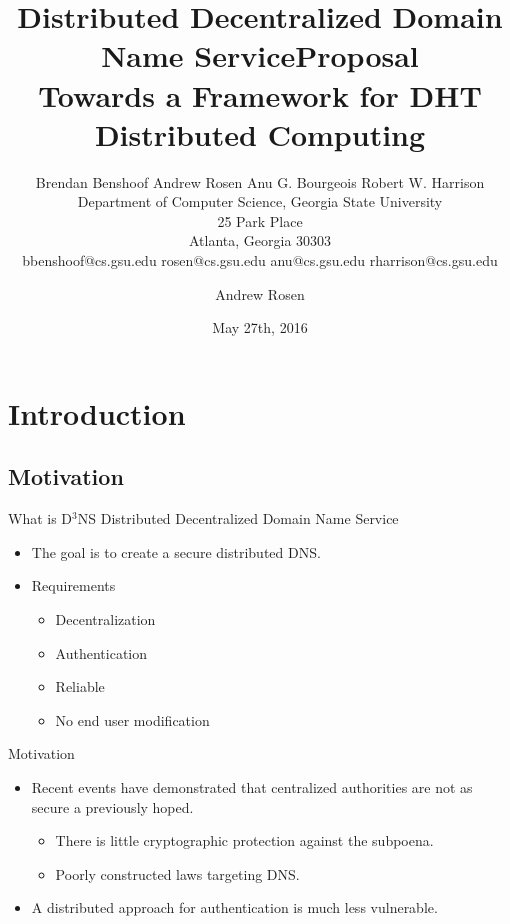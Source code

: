 \documentclass[11pt]{beamer}
\title[D$^3$NS]{Distributed Decentralized Domain Name Service}
\author{
Brendan Benshoof \qquad Andrew Rosen  \qquad Anu G. Bourgeois \qquad Robert W. Harrison \\Department of Computer Science, Georgia State University\\ 25 Park Place\\ Atlanta, Georgia 30303\\  bbenshoof@cs.gsu.edu \qquad rosen@cs.gsu.edu  \qquad anu@cs.gsu.edu   \qquad rharrison@cs.gsu.edu }\author{Andrew Rosen}
\title[DHT Distributed Computing]{Proposal \\ Towards a Framework for DHT Distributed Computing}
\institute{Georgia State University}
\date{May 27th, 2016}
\begin{document}
	
\maketitle

\section{Introduction}
\subsection{Motivation}

\begin{frame}{What is D$^3$NS}
Distributed Decentralized Domain Name Service

\begin{itemize}
	\item The goal is to create a secure distributed DNS. 
	\item Requirements 
	\begin{itemize}
		\item Decentralization
		\item Authentication
		\item Reliable
		\item No end user modification
	\end{itemize}


\end{itemize}

\end{frame}



\begin{frame}{Motivation}
	\begin{itemize}
		\item  Recent events have demonstrated that centralized authorities are not as secure a previously hoped.
		\begin{itemize}
			\item There is little cryptographic protection against the subpoena.
			\item Poorly constructed laws targeting DNS.
		\end{itemize}	
		\item  A distributed approach for authentication is much less vulnerable.
	
	\end{itemize}
\end{frame}
\end{document}
